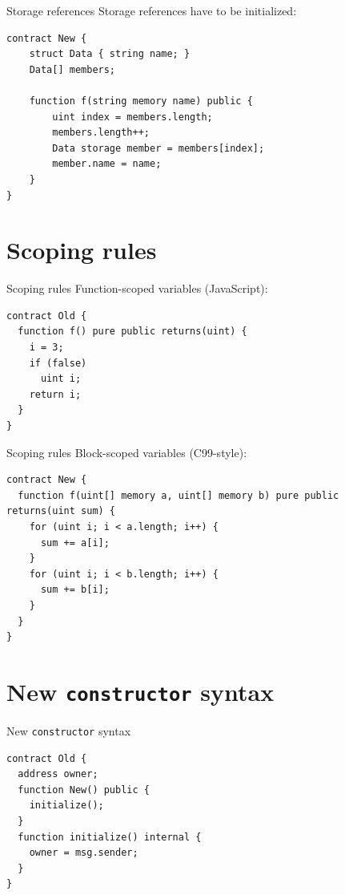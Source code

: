 \documentclass[aspectratio=169,10pt]{beamer}
\begin{document}
\begin{frame}[fragile]{Storage references}
Storage references have to be initialized:
\begin{mdframed}
\begin{lstlisting}[language=Solidity]
contract New {
    struct Data { string name; }
    Data[] members;

    function f(string memory name) public {
        uint index = members.length;
        members.length++;
        Data storage member = members[index];
        member.name = name;
    }
}
\end{lstlisting}
\end{mdframed}
\end{frame}

\section{Scoping rules}

\begin{frame}[fragile]{Scoping rules}
  Function-scoped variables (JavaScript):
  \begin{mdframed}
  \begin{lstlisting}[language=Solidity]
contract Old {
  function f() pure public returns(uint) {
    i = 3;
    if (false)
      uint i;
    return i;
  }
}
  \end{lstlisting}
  \end{mdframed}
\end{frame}

\begin{frame}[fragile]{Scoping rules}
  Block-scoped variables (C99-style):
  \begin{mdframed}
  \begin{lstlisting}[language=Solidity]
contract New {
  function f(uint[] memory a, uint[] memory b) pure public returns(uint sum) {
    for (uint i; i < a.length; i++) {
      sum += a[i];
    }
    for (uint i; i < b.length; i++) {
      sum += b[i];
    }
  }
}
  \end{lstlisting}
  \end{mdframed}
\end{frame}

\section{New \texttt{constructor} syntax}

\begin{frame}[fragile]{New \texttt{constructor} syntax}
  \begin{mdframed}
  \begin{lstlisting}[language=Solidity]
contract Old {
  address owner;
  function New() public {
    initialize();
  }
  function initialize() internal {
    owner = msg.sender; 
  }
}
  \end{lstlisting}
  \end{mdframed}
\end{frame}
\end{document}
